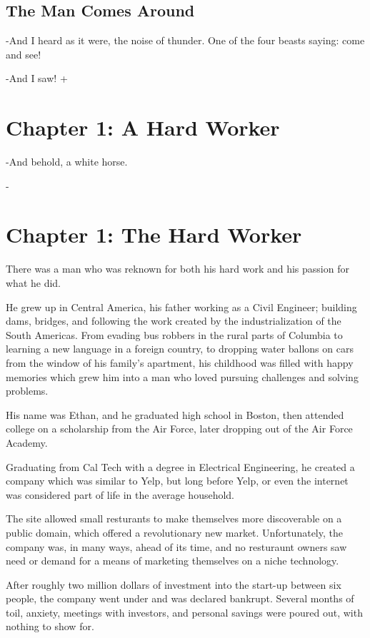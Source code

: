 \documentclass[a4paper,12pt,twoside]{book}
\begin{document}
\section{The Man Comes Around}
-And I heard as it were, the noise of thunder.  One of the four beasts saying: come and see!
 
-And I saw! 
+\chapter{Chapter 1: A Hard Worker}
 
-And behold, a white horse.

-\chapter{Chapter 1: The Hard Worker}
 There was a man who was reknown for both his hard work and his passion for what he did.  

He grew up in Central America, his father working as a Civil Engineer; building dams, bridges, and following the work created by the industrialization of the South Americas.  From evading bus robbers in the rural parts of Columbia to learning a new language in a foreign country, to dropping water ballons on cars from the window of his family's apartment, his childhood was filled with happy memories which grew him into a man who loved pursuing challenges and solving problems.

His name was Ethan, and he graduated high school in Boston, then attended college on a scholarship from the Air Force, later dropping out of the Air Force Academy.

Graduating from Cal Tech with a degree in Electrical Engineering, he created a company which was similar to Yelp, but long before Yelp, or even the internet was considered part of life in the average household.  

The site allowed small resturants to make themselves more discoverable on a public domain, which offered a revolutionary new market.  Unfortunately, the company was, in many ways, ahead of its time, and no resturaunt owners saw need or demand for a means of marketing themselves on a niche technology. 

After roughly two million dollars of investment into the start-up between six people, the company went under and was declared bankrupt.  Several months of toil, anxiety, meetings with investors, and personal savings were poured out, with nothing to show for.
\end{document}
